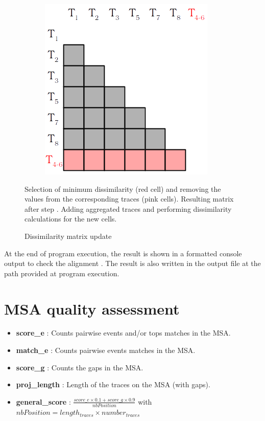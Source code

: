 \documentclass[12pt,a4paper]{article}
\begin{document}
\begin{figure}[H]
\begin{subfigure}[t]{0.33\linewidth}
		\includegraphics[width=0.7\linewidth]{img/matrix3.png}
		\caption{}
		\label{sub:matrix3}
	\end{subfigure}
	\caption{Dissimilarity matrix update}{
		\emph{\color{blue}{(a)}} Selection of minimum dissimilarity (red cell) and removing the values from the corresponding traces (pink cells).
		\emph{\color{blue}{(b)}} Resulting matrix after step \emph{\color{blue}{a}}.
		\emph{\color{blue}{(c)}} Adding aggregated traces and performing dissimilarity calculations for the new cells.
	}
	\label{fig:matrix}
\end{figure}

At the end of program execution, the result is shown in a formatted console output to check the alignment {}. The result is also written in the output file at the path provided at program execution.




\section{MSA quality assessment}


\begin{itemize}
	\item \textbf{score\_e} : Counts pairwise events and/or tops matches in the MSA.
	\item \textbf{match\_e} : Counts pairwise events matches in the MSA.
	\item \textbf{score\_g} : Counts the gaps in the MSA.
	\item \textbf{proj\_length} : Length of the traces on the MSA (with gaps).
	\item \textbf{general\_score} : $\frac{score\_e \times 0.1 + score\_g \times 0.9}{nbPosition}$ with $nbPosition = length_{traces} \times number_{traces}$
\end{itemize}
\end{document}
